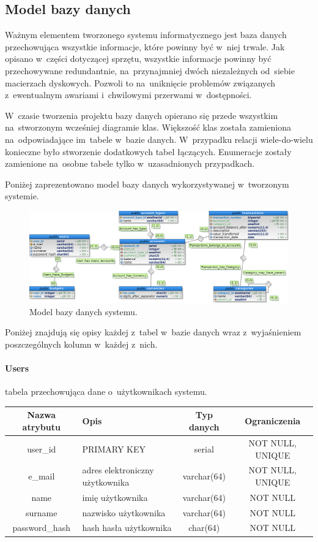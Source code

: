 \subsection{Model bazy danych}
Ważnym elementem tworzonego systemu informatycznego jest baza danych przechowująca wszystkie informacje, które powinny być w~niej trwale. Jak opisano w~części dotyczącej sprzętu, wszystkie informacje powinny być przechowywane redundantnie, na~przynajmniej dwóch niezależnych od~siebie macierzach dyskowych. Pozwoli to na~uniknięcie problemów związanych z~ewentualnym awariami i~chwilowymi przerwami w~dostępności.

W~czasie tworzenia projektu bazy danych opierano się przede wszystkim na~stworzonym wcześniej diagramie klas. Większość klas została zamieniona na~odpowiadające im~tabele w~bazie danych. W~przypadku relacji wiele-do-wielu konieczne było stworzenie dodatkowych tabel łączących. Enumeracje zostały zamienione na~osobne tabele tylko w~uzasadnionych przypadkach.

Poniżej zaprezentowano model bazy danych wykorzystywanej w~tworzonym systemie.

\begin{figure}[H]
  \centering
  \includegraphics[width=1.4\textwidth,angle=90]{images/db.png}
  \caption{Model bazy danych systemu.}
\end{figure}

Poniżej znajdują się opisy każdej z~tabel w~bazie danych wraz z~wyjaśnieniem poszczególnych kolumn w~każdej z~nich.

\paragraph{Users} tabela przechowująca dane o~użytkownikach systemu.\\

\begin{tabular}{| c | p{4cm} | c | c |}
  \hline \textbf{Nazwa atrybutu} & \textbf{Opis} & \textbf{Typ danych} & \textbf{Ograniczenia} \\ \hline
  user\_id & PRIMARY KEY & serial & NOT NULL, UNIQUE \\ \hline
  e\_mail & adres elektroniczny użytkownika & varchar(64) & NOT NULL, UNIQUE \\ \hline
  name & imię użytkownika & varchar(64) & NOT NULL \\ \hline
  surname & nazwisko użytkownika & varchar(64) & NOT NULL \\ \hline
  password\_hash & hash hasła użytkownika & char(64) & NOT NULL \\ \hline
\end{tabular}

